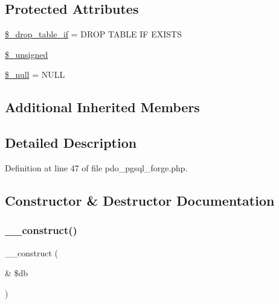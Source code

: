 \subsection*{Protected Attributes}
\begin{DoxyCompactItemize}
\item 
\mbox{\hyperlink{class_c_i___d_b__pdo__pgsql__forge_a92a8a9145a7fc91e252e58d019373581}{\$\+\_\+drop\+\_\+table\+\_\+if}} = \textquotesingle{}D\+R\+OP T\+A\+B\+LE IF E\+X\+I\+S\+TS\textquotesingle{}
\item 
\mbox{\hyperlink{class_c_i___d_b__pdo__pgsql__forge_aae977ae6d61fa183f0b25422b6ddc31c}{\$\+\_\+unsigned}}
\item 
\mbox{\hyperlink{class_c_i___d_b__pdo__pgsql__forge_ae58fe6a5104d4a069a49b27533ce808f}{\$\+\_\+null}} = \textquotesingle{}N\+U\+LL\textquotesingle{}
\end{DoxyCompactItemize}
\subsection*{Additional Inherited Members}


\subsection{Detailed Description}


Definition at line 47 of file pdo\+\_\+pgsql\+\_\+forge.\+php.



\subsection{Constructor \& Destructor Documentation}
\mbox{\label{class_c_i___d_b__pdo__pgsql__forge_aaf2ef772755ec6f361d44e16cc9ffd69}} 
\subsubsection{\texorpdfstring{\_\_construct()}{\_\_construct()}}
{\footnotesize\ttfamily \+\_\+\+\_\+construct (\begin{DoxyParamCaption}\item[{\&}]{\$db }\end{DoxyParamCaption})}

